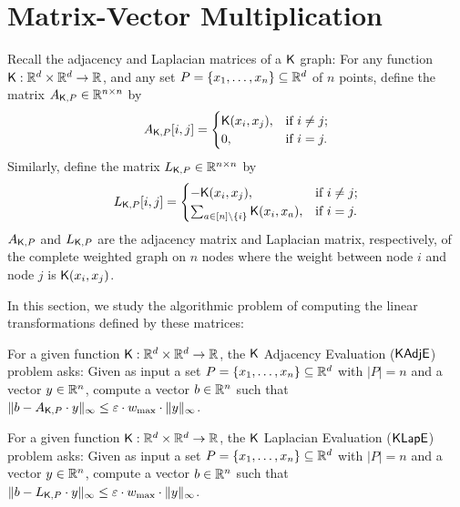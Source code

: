 \section{Matrix-Vector Multiplication}


Recall the adjacency and Laplacian matrices of a $\mathsf{K}$ graph: For any function $\mathsf{K} : {\mathbb R}^d \times {\mathbb R}^d \to {\mathbb R}$, and any set $P = \{x_1, \ldots, x_n\} \subseteq {\mathbb R}^d$ of $n$ points, define the matrix $A_{\mathsf{K},P} \in {\mathbb R}^{n \times n}$ by 
\begin{align*}
A_{\mathsf{K},P}[i,j] = 
\begin{cases} 
\mathsf{K}(x_i, x_j), & \text{if } i \neq j ; \\
 0, &\text{if } i=j.
\end{cases}
\end{align*}
Similarly, define the matrix $L_{\mathsf{K},P} \in {\mathbb R}^{n \times n}$ by 
\begin{align*}
L_{\mathsf{K},P}[i,j] = 
\begin{cases} 
- \mathsf{K}(x_i, x_j), & \text{if } i \neq j ; \\ 
\sum_{a \in [n] \setminus \{i\}} \mathsf{K}(x_i, x_a), &\text{if } i=j.
\end{cases}
\end{align*}
$A_{\mathsf{K},P}$ and $L_{\mathsf{K},P}$ are the adjacency matrix and Laplacian matrix, respectively, of the complete weighted graph on $n$ nodes where the weight between node $i$ and node $j$ is $\mathsf{K}(x_i, x_j)$. 

In this section, we study the algorithmic problem of computing the linear transformations defined by these matrices:

\begin{problem}\label{pro:KAdjE}
For a given function $\mathsf{K} : {\mathbb R}^d \times {\mathbb R}^d \to {\mathbb R}$, the $\mathsf{K}$ Adjacency Evaluation ($\mathsf{KAdjE}$) problem asks: Given as input a set $P =\{x_1, \ldots, x_n\} \subseteq {\mathbb R}^d$ with $|P|=n$ and a vector $y \in {\mathbb R}^n$, compute a vector $b \in {\mathbb R}^n$ such that $\|b - A_{\mathsf{K},P} \cdot y \|_\infty \leq \varepsilon \cdot w_{\max} \cdot \|y\|_\infty$.
\end{problem}

\begin{problem}\label{pro:KLapE}
For a given function $\mathsf{K} : {\mathbb R}^d \times {\mathbb R}^d \to {\mathbb R}$, the $\mathsf{K}$ Laplacian Evaluation ($\mathsf{KLapE}$) problem asks: Given as input a set $P =\{x_1, \ldots, x_n\} \subseteq {\mathbb R}^d$ with $|P|=n$ and a vector $y \in {\mathbb R}^n$, compute a vector $b \in {\mathbb R}^n$ such that $\|b - L_{\mathsf{K},P} \cdot y \|_\infty \leq \varepsilon \cdot w_{\max} \cdot \|y\|_\infty$.
\end{problem}

